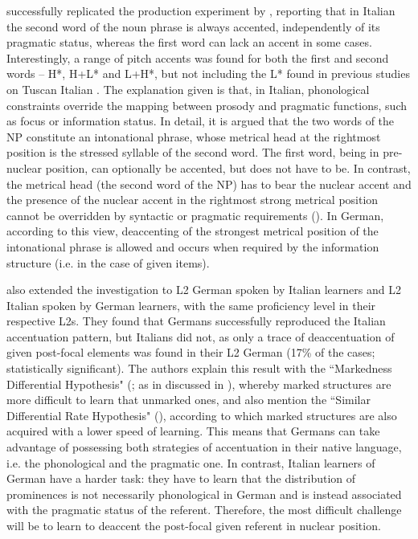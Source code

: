 \citet{AvesaniEtAl2013,AvesaniEtAl2015} successfully replicated the production experiment by \citet{SwertsEtAl2002}, reporting that in Italian the second word of the noun phrase is always accented, independently of its pragmatic status, whereas the first word can lack an accent in some cases. Interestingly, a range of pitch accents was found for both the first and second words – H*, H+L* and L+H*, but not including the L* found in previous studies on Tuscan Italian \citep{Bocci2013}. The explanation given is that, in Italian, phonological constraints override the mapping between prosody and pragmatic functions, such as focus or information status. In detail, it is argued that the two words of the NP constitute an intonational phrase, whose metrical head at the rightmost position is the stressed syllable of the second word. The first word, being in pre-nuclear position, can optionally be accented, but does not have to be. In contrast, the metrical head (the second word of the NP) has to bear the nuclear accent and the presence of the nuclear accent in the rightmost strong metrical position cannot be overridden by syntactic or pragmatic requirements (\citealt{AvesaniEtAl2015}). In German, according to this view, deaccenting of the strongest metrical position of the intonational phrase is allowed and occurs when required by the information structure (i.e. in the case of given items).

\citet{AvesaniEtAl2013,AvesaniEtAl2015} also extended the investigation to L2 German spoken by Italian learners and L2 Italian spoken by German learners, with the same proficiency level in their respective L2s. They found that Germans successfully reproduced the Italian accentuation pattern, but Italians did not, as only a trace of deaccentuation of given post-focal elements was found in their L2 German (17\% of the cases; statistically significant). The authors explain this result with the ``Markedness Differential Hypothesis" (\citealt{Eckman1977}; as in \citealt{RasierHiligsmann2007} discussed in ), whereby marked structures are more difficult to learn that unmarked ones, and also mention the ``Similar Differential Rate Hypothesis" (\citealt{MajorKim1996}), according to which marked structures are also acquired with a lower speed of learning. This means that Germans can take advantage of possessing both strategies of accentuation in their native language, i.e. the phonological and the pragmatic one. In contrast, Italian learners of German have a harder task: they have to learn that the distribution of prominences is not necessarily phonological in German and is instead associated with the pragmatic status of the referent. Therefore, the most difficult challenge will be to learn to deaccent the post-focal given referent in nuclear position.


